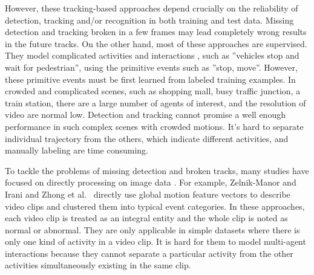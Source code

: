 However, these tracking-based approaches depend crucially on the reliability of detection, tracking and/or recognition in both training and test data. Missing detection and tracking broken in a few frames may lead completely wrong results in the future tracks. On the other hand, most of these approaches are supervised. They model complicated activities and interactions \cite{ghanem2004representation}, such as ''vehicles stop and wait for pedestrian'', using the primitive events such as ''stop, move''. However, these primitive events must be first learned from labeled training examples. In crowded and complicated scenes, such as shopping mall, busy traffic junction, a train station, there are a large number of agents of interest, and the resolution of video are normal low. Detection and tracking cannot promise a well enough performance in such  complex scenes with crowded motions. 
It's hard to separate individual trajectory from the others, which indicate different activities, and manually labeling are time consuming. 


To tackle the problems of missing detection and broken tracks,  many studies have focused on directly processing on image data \cite{zelnik2001event, zhong2004detecting, boiman2007detecting}. For example,  Zelnik-Manor and Irani \cite{zelnik2001event} and Zhong et al.~\cite{zhong2004detecting} directly use global motion feature vectors to describe video clips and clustered them into typical event categories. In these approaches, each video clip is treated as an integral entity and the whole clip is noted as normal or abnormal. They are only applicable in simple datasets where there is only one kind of activity in a video clip. It is hard for them to model multi-agent interactions because they cannot separate a particular activity from the other activities simultaneously existing in the same clip.

